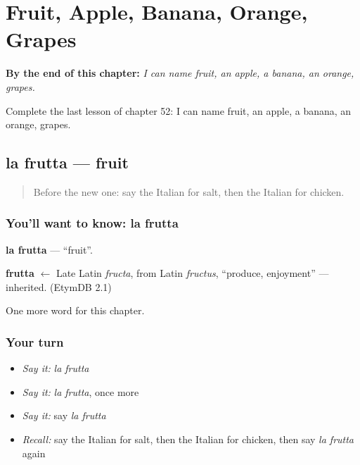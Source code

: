 
\chapter{Fruit, Apple, Banana, Orange, Grapes}
\label{ch:it-fruit-apple-banana-orange-grapes}

\begin{chapteropening}
\textbf{By the end of this chapter:} \emph{I can name fruit, an apple, a banana, an orange, grapes.}

Complete the last lesson of chapter 52: I can name fruit, an apple, a banana, an orange, grapes.
\end{chapteropening}

\section[la frutta]{la frutta — fruit}

\label{lesson:IT-C52-frutta}



\begin{quote}
Before the new one: say the Italian for salt, then the Italian for chicken.
\end{quote}

\subsection*{You'll want to know: la frutta}
\textbf{la frutta} — \textquotedblleft{}fruit\textquotedblright{}.

\begin{cousinweb}
\textbf{frutta} $\leftarrow$ Late Latin \emph{fructa}, from Latin \emph{fructus}, \textquotedblleft{}produce, enjoyment\textquotedblright{} — inherited. (EtymDB 2.1)
\end{cousinweb}

\begin{grammarlens}[title={What you've built}]
One more word for this chapter.
\end{grammarlens}

\subsection*{Your turn}
\begin{itemize}
\raggedright
  \item \emph{Say it:} \emph{la frutta}
  \item \emph{Say it:} \emph{la frutta}, once more
  \item \emph{Say it:} say \emph{la frutta}
  \item \emph{Recall:} say the Italian for salt, then the Italian for chicken, then say \emph{la frutta} again
\end{itemize}

